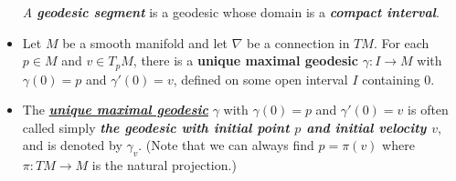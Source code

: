 \documentclass[11pt]{article}
\begin{document}
\begin{itemize}
\begin{definition}
\emph{A \textbf{geodesic segment}} is a geodesic whose domain is a \emph{\textbf{compact interval}}.
\end{definition}

\item \begin{corollary}
Let $M$ be a smooth manifold and let $\nabla$ be a connection in $TM$. For each $p \in M$ and $v \in T_{p}M$, there is a \textbf{unique maximal geodesic} $\gamma: I \rightarrow M$ with $\gamma(0) = p$ and $\gamma'(0) = v$, defined on some open interval $I$ containing $0$.
\end{corollary}

\item \begin{definition}
The \underline{\emph{\textbf{unique maximal geodesic}}} $\gamma$ with $\gamma(0) = p$ and $\gamma'(0) = v$ is often called simply \emph{\textbf{the geodesic with initial point $p$ and initial velocity $v$}}, and is denoted by $\gamma_v$. (Note that we can always find $p = \pi(v)$ where $\pi: TM \rightarrow M$ is the natural projection.)
\end{definition}
\end{itemize}
\end{document}
